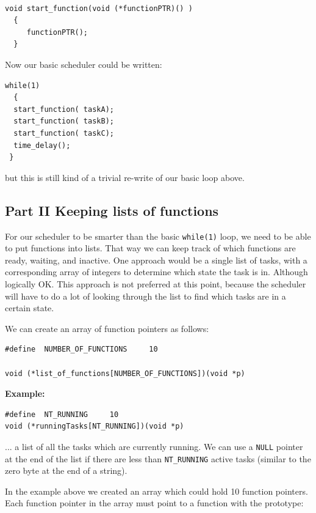 \documentclass{article}	%
\begin{document}
\begin{verbatim}

void start_function(void (*functionPTR)() )
  {
     functionPTR();
  }

\end{verbatim}



Now our basic scheduler could be written:

\begin{verbatim}
while(1)
  {
  start_function( taskA);
  start_function( taskB);
  start_function( taskC);
  time_delay();
 }
\end{verbatim}

but this is still kind of a trivial re-write of our basic loop above.   


\subsection{Part II   Keeping lists of functions }

For our scheduler to be smarter than the basic {\tt while(1)} loop, we need to be able to put functions into lists.   That way we can keep track of which functions are ready, 
waiting, and inactive.    One approach would be a single list of tasks, with a corresponding array of integers to determine which state the task is in. 
Although logically OK. This approach is not preferred at this point, because the scheduler will have to do a lot of looking through the list to find which tasks are in a certain state.  


We can create an array of function pointers as follows:

\begin{verbatim}
#define  NUMBER_OF_FUNCTIONS     10

void (*list_of_functions[NUMBER_OF_FUNCTIONS])(void *p)
\end{verbatim}

{\bf Example: }

\begin{verbatim}
#define  NT_RUNNING     10
void (*runningTasks[NT_RUNNING])(void *p)
\end{verbatim}
\noindent
... a list of all the tasks  which are currently running.  
We can use a {\tt NULL} pointer 
at the end of the list if there are less than {\tt NT\_RUNNING} active tasks 
(similar to the zero byte at the end of a string). 


In the example above we created an  array which could hold 10 function pointers.  Each function pointer in the array must point to a function with the prototype:
\end{document}
